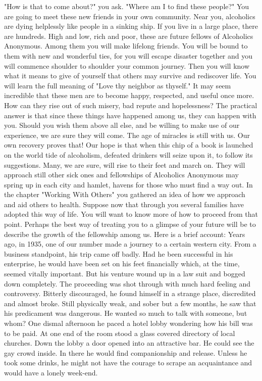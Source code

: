 \begin{biblechapter}
"How is that to come about?" you ask.  "Where am I to find these people?"
You are going to meet these new friends in your own community.  Near you, alcoholics are dying helplessly like people in a sinking ship.  If you live in a large place, there are hundreds.  High and low, rich and poor, these are future fellows of Alcoholics Anonymous.  Among them you will make lifelong friends.  You will be bound to them with new and wonderful ties, for you will escape disaster together and you will commence shoulder to shoulder your common journey.  Then you will know what it means to give of yourself that others may survive and rediscover life.  You will learn the full meaning of "Love thy neighbor as thyself."
It may seem incredible that these men are to become happy, respected, and useful once more.  How can they rise out of such misery, bad repute and hopelessness?  The practical answer is that since these things have happened among us, they can happen with you.  Should you wish them above all else, and be willing to make use of our experience, we are sure they will come.  The age of miracles is still with us.  Our own recovery proves that!
Our hope is that when this chip of a book is launched on the world tide of alcoholism, defeated drinkers will seize upon it, to follow its suggestions.  Many, we are sure, will rise to their feet and march on.  They will approach still other sick ones and fellowships of Alcoholics Anonymous may spring up in each city and hamlet, havens for those who must find a way out.
In the chapter "Working With Others" you gathered an idea of how we approach and aid others to health.  Suppose now that through you several families have adopted this way of life.  You will want to know more of how to proceed from that point.  Perhaps the best way of treating you to a glimpse of your future will be to describe the growth of the fellowship among us.  Here is a brief account:
Years ago, in 1935, one of our number made a journey to a certain western city.  From a business standpoint, his trip came off badly.  Had he been successful in his enterprise, he would have  been set on his feet financially which, at the time, seemed vitally important.  But his venture wound up in a law suit and bogged down completely.  The proceeding was shot through with much hard feeling and controversy.
Bitterly discouraged, he found himself in a strange place, discredited and almost broke.  Still physically weak, and sober but a few months, he saw that his predicament was dangerous.  He wanted so much to talk with someone, but whom?
One dismal afternoon he paced a hotel lobby wondering how his bill was to be paid.  At one end of the room stood a glass covered directory of local churches.  Down the lobby a door opened into an attractive bar.  He could see the gay crowd inside.  In there he would find companionship and release.  Unless he took some drinks, he might not have the courage to scrape an acquaintance and would have a lonely week-end.

\end{biblechapter}
